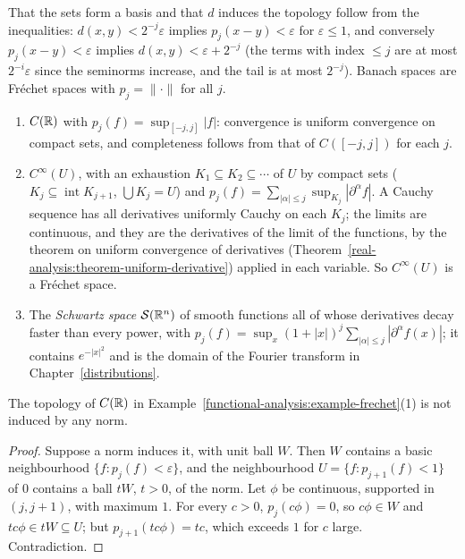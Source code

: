 That the sets form a basis and that $d$ induces the topology follow from the inequalities: $d(x, y) < 2^{-j}\varepsilon$ implies $p_j(x - y) < \varepsilon$ for $\varepsilon \leq 1$, and conversely
$p_j(x - y) < \varepsilon$ implies $d(x, y) < \varepsilon + 2^{-j}$ (the terms with index $\leq j$ are at most $2^{-i}\varepsilon$ since the seminorms increase, and the tail is at most $2^{-j}$).
Banach spaces are Fr\'echet spaces with $p_j = \|\cdot\|$ for all $j$.

\begin{example}\label{functional-analysis:example-frechet}
\begin{enumerate}
\item $C(\mathbb{R})$ with $p_j(f) = \sup_{[-j, j]}|f|$: convergence is uniform convergence on compact sets, and completeness follows from that of $C([-j, j])$ for each $j$.
\item $C^\infty(U)$, with an exhaustion $K_1 \subseteq K_2 \subseteq \cdots$ of $U$ by compact sets ($K_j \subseteq \operatorname{int}K_{j+1}$, $\bigcup K_j = U$) and
$p_j(f) = \sum_{|\alpha| \leq j}\sup_{K_j}|\partial^\alpha f|$. A Cauchy sequence has all derivatives uniformly Cauchy on each $K_j$; the limits are continuous, and they are the derivatives of the limit
of the functions, by the theorem on uniform convergence of derivatives (Theorem~\ref{real-analysis:theorem-uniform-derivative}) applied in each variable. So $C^\infty(U)$ is a Fr\'echet space.
\item The \emph{Schwartz space} $\mathcal{S}(\mathbb{R}^n)$ of smooth functions all of whose derivatives decay faster than every power, with $p_j(f) = \sup_x(1 + |x|)^j\sum_{|\alpha| \leq j}|\partial^\alpha f(x)|$; it
contains $e^{-|x|^2}$ and is the domain of the Fourier transform in Chapter~\ref{distributions}.
\end{enumerate}
\end{example}

\begin{proposition}\label{functional-analysis:proposition-not-normable}
The topology of $C(\mathbb{R})$ in Example~\ref{functional-analysis:example-frechet}(1) is not induced by any norm.
\end{proposition}

\begin{proof}
Suppose a norm induces it, with unit ball $W$. Then $W$ contains a basic neighbourhood $\{f : p_j(f) < \varepsilon\}$, and the neighbourhood $U = \{f : p_{j+1}(f) < 1\}$ of $0$ contains a ball $tW$,
$t > 0$, of the norm. Let $\phi$ be continuous, supported in $(j, j + 1)$, with maximum $1$. For every $c > 0$, $p_j(c\phi) = 0$, so $c\phi \in W$ and $tc\phi \in tW \subseteq U$; but
$p_{j+1}(tc\phi) = tc$, which exceeds $1$ for $c$ large. Contradiction.
\end{proof}

